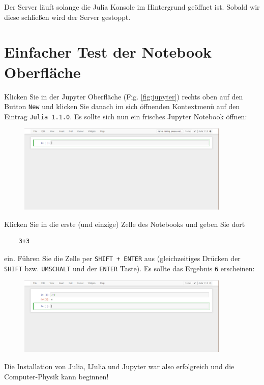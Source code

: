 \documentclass[11pt, a4paper]{scrartcl}
\begin{document}
	Der Server läuft solange die Julia Konsole im Hintergrund geöffnet ist. Sobald wir diese schließen wird der Server gestoppt.
	
	\newpage
	\section{Einfacher Test der Notebook Oberfläche}
	
	Klicken Sie in der Jupyter Oberfläche (Fig. \ref{fig:jupyter}) rechts oben auf den Button \texttt{New} und klicken Sie danach im sich öffnenden Kontextmenü auf den Eintrag \texttt{Julia 1.1.0}. Es sollte sich nun ein frisches Jupyter Notebook öffnen:
	
	\begin{figure}[h!]
	\centering
	\includegraphics[width=0.9\textwidth]{imgs/jupyter_notebook.png}
	\end{figure}

	Klicken Sie in die erste (und einzige) Zelle des Notebooks und geben Sie dort
	
	\begin{lstlisting}
	3+3
	\end{lstlisting}
	ein. Führen Sie die Zelle per \texttt{SHIFT + ENTER} aus (gleichzeitiges Drücken der \texttt{SHIFT} bzw. \texttt{UMSCHALT} und der \texttt{ENTER} Taste). Es sollte das Ergebnis \texttt{6} erscheinen:

	\begin{figure}[h!]
	\centering
	\includegraphics[width=0.9\textwidth]{imgs/jupyter_notebook_test.png}
	\end{figure}	

	Die Installation von Julia, IJulia und Jupyter war also erfolgreich und die Computer-Physik kann beginnen!
	
\end{document}

